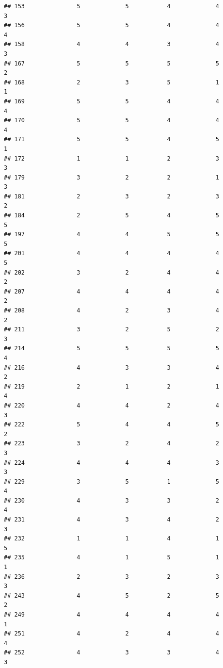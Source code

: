 \documentclass[
]{article}
\begin{document}
\begin{verbatim}
## 153               5             5           4             4            3
## 156               5             5           4             4            4
## 158               4             4           3             4            3
## 167               5             5           5             5            2
## 168               2             3           5             1            1
## 169               5             5           4             4            4
## 170               5             5           4             4            4
## 171               5             5           4             5            1
## 172               1             1           2             3            3
## 179               3             2           2             1            3
## 181               2             3           2             3            2
## 184               2             5           4             5            5
## 197               4             4           5             5            5
## 201               4             4           4             4            5
## 202               3             2           4             4            2
## 207               4             4           4             4            2
## 208               4             2           3             4            2
## 211               3             2           5             2            3
## 214               5             5           5             5            4
## 216               4             3           3             4            2
## 219               2             1           2             1            4
## 220               4             4           2             4            3
## 222               5             4           4             5            2
## 223               3             2           4             2            3
## 224               4             4           4             3            3
## 229               3             5           1             5            4
## 230               4             3           3             2            4
## 231               4             3           4             2            3
## 232               1             1           4             1            5
## 235               4             1           5             1            1
## 236               2             3           2             3            3
## 243               4             5           2             5            2
## 249               4             4           4             4            1
## 251               4             2           4             4            4
## 252               4             3           3             4            3

\end{verbatim}
\end{document}
